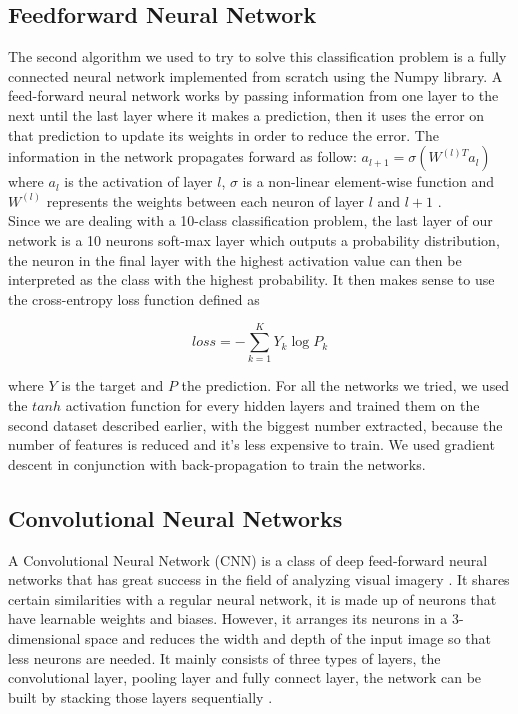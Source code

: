 \documentclass[letterpaper, 10 pt, conference]{ieeeconf}  %
\begin{document}
\subsection{Feedforward Neural Network}
The second algorithm we used to try to solve this classification problem is a fully connected neural network implemented from scratch using the Numpy library. A feed-forward neural network works by passing information from one layer to the next until the last layer where it makes a prediction, then it uses the error on that prediction to update its weights in order to reduce the error. The information in the network propagates forward as follow: $a_{l+1} = \sigma (W^{(l)T}a_l)$ where $a_l$ is the activation of layer $l$, $\sigma$ is a non-linear element-wise function and $W^{(l)}$ represents the weights between each neuron of layer $l$ and $l+1$ \cite{goodfellow2016deep}. \\
Since we are dealing with a 10-class classification problem, the last layer of our network is a 10 neurons soft-max layer which outputs a probability distribution, the neuron in the final layer with the highest activation value can then be interpreted as the class with the highest probability. It then makes sense to use the cross-entropy loss function defined as
\begin{center}
$$loss = - \sum_{k=1}^{K}Y_k \log{P_k}$$
\end{center}
where $Y$ is the target and $P$ the prediction.
For all the networks we tried, we used the $tanh$ activation function for every hidden layers and trained them on the second dataset described earlier, with the biggest number extracted, because the number of features is reduced and it's less expensive to train. We used gradient descent in conjunction with back-propagation to train the networks.


\subsection{Convolutional Neural Networks}
A Convolutional Neural Network (CNN) is a class of deep feed-forward neural networks that has great success in the field of analyzing visual imagery \cite{wiki:cnn}. It shares certain similarities with a regular neural network, it is made up of neurons that have learnable weights and biases. However, it arranges its neurons in a 3-dimensional space and reduces the width and depth of the input image so that less neurons are needed. It mainly consists of three types of layers, the convolutional layer, pooling layer and fully connect layer, the network can be built by stacking those layers sequentially \cite{karpathycnn}. 
\end{document}
